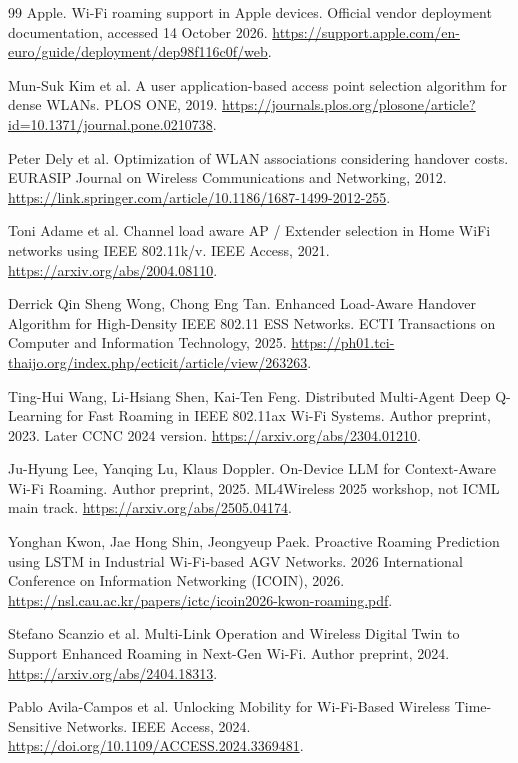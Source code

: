 \documentclass[11pt,a4paper]{article}
\begin{document}
\begin{thebibliography}{99}
 Apple. Wi-Fi roaming support in Apple devices. Official vendor deployment documentation, accessed 14 October 2026.
\url{https://support.apple.com/en-euro/guide/deployment/dep98f116c0f/web}.

 Mun-Suk Kim et al. A user application-based access point selection algorithm for dense WLANs. PLOS ONE, 2019.
\url{https://journals.plos.org/plosone/article?id=10.1371/journal.pone.0210738}.

 Peter Dely et al. Optimization of WLAN associations considering handover costs. EURASIP Journal on Wireless Communications and Networking, 2012.
\url{https://link.springer.com/article/10.1186/1687-1499-2012-255}.

 Toni Adame et al. Channel load aware AP / Extender selection in Home WiFi networks using IEEE 802.11k/v. IEEE Access, 2021.
\url{https://arxiv.org/abs/2004.08110}.

 Derrick Qin Sheng Wong, Chong Eng Tan. Enhanced Load-Aware Handover Algorithm for High-Density IEEE 802.11 ESS Networks. ECTI Transactions on Computer and Information Technology, 2025.
\url{https://ph01.tci-thaijo.org/index.php/ecticit/article/view/263263}.

 Ting-Hui Wang, Li-Hsiang Shen, Kai-Ten Feng. Distributed Multi-Agent Deep Q-Learning for Fast Roaming in IEEE 802.11ax Wi-Fi Systems. Author preprint, 2023. Later CCNC 2024 version.
\url{https://arxiv.org/abs/2304.01210}.

 Ju-Hyung Lee, Yanqing Lu, Klaus Doppler. On-Device LLM for Context-Aware Wi-Fi Roaming. Author preprint, 2025. ML4Wireless 2025 workshop, not ICML main track.
\url{https://arxiv.org/abs/2505.04174}.

 Yonghan Kwon, Jae Hong Shin, Jeongyeup Paek. Proactive Roaming Prediction using LSTM in Industrial Wi-Fi-based AGV Networks. 2026 International Conference on Information Networking (ICOIN), 2026.
\url{https://nsl.cau.ac.kr/papers/ictc/icoin2026-kwon-roaming.pdf}.

 Stefano Scanzio et al. Multi-Link Operation and Wireless Digital Twin to Support Enhanced Roaming in Next-Gen Wi-Fi. Author preprint, 2024.
\url{https://arxiv.org/abs/2404.18313}.

 Pablo Avila-Campos et al. Unlocking Mobility for Wi-Fi-Based Wireless Time-Sensitive Networks. IEEE Access, 2024.
\url{https://doi.org/10.1109/ACCESS.2024.3369481}.


\end{thebibliography}
\end{document}
